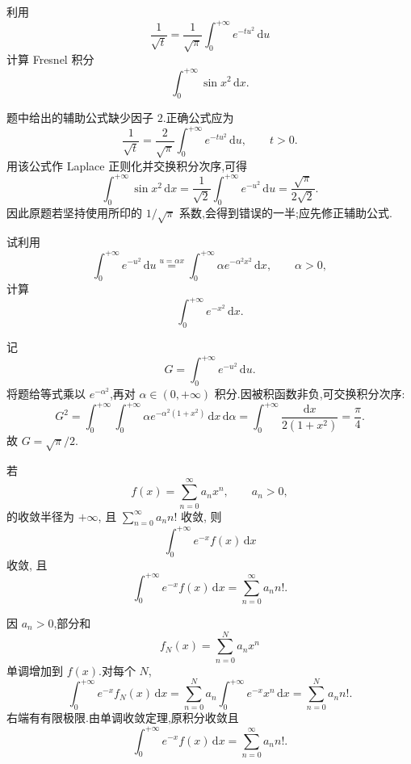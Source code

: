 \begin{example}
    利用
    \[
        \dfrac{1}{\sqrt{t}}=\dfrac{1}{\sqrt{\pi}}\int_0^{+\infty}e^{-tu^2}\,\mathrm{d}u
    \]
    计算 Fresnel 积分
    \[
        \int_0^{+\infty}\sin x^2\,\mathrm{d}x.
    \]
\end{example}
\exampleblank

\begin{solution}
    题中给出的辅助公式缺少因子 $2$.正确公式应为
    \[
        \dfrac{1}{\sqrt t}=\dfrac{2}{\sqrt\pi}\int_0^{+\infty}e^{-tu^2}\,\mathrm{d}u,
        \qquad t>0.
    \]
    用该公式作 Laplace 正则化并交换积分次序,可得
    \[
        \int_0^{+\infty}\sin x^2\,\mathrm{d}x
        =\dfrac{1}{\sqrt2}\int_0^{+\infty}e^{-u^2}\,\mathrm{d}u
        =\dfrac{\sqrt\pi}{2\sqrt2}.
    \]
    因此原题若坚持使用所印的 $1/\sqrt\pi$ 系数,会得到错误的一半;应先修正辅助公式.
\end{solution}

\begin{example}
    试利用
    \[
        \int_0^{+\infty}e^{-u^2}\,\mathrm{d}u
        \overset{u=\alpha x}{=}
        \int_0^{+\infty}\alpha e^{-\alpha^2x^2}\,\mathrm{d}x,
        \qquad \alpha>0,
    \]
    计算
    \[
        \int_0^{+\infty}e^{-x^2}\,\mathrm{d}x.
    \]
\end{example}
\exampleblank

\begin{solution}
    记
    \[
        G=\int_0^{+\infty}e^{-u^2}\,\mathrm{d}u.
    \]
    将题给等式乘以 $e^{-\alpha^2}$,再对 $\alpha\in(0,+\infty)$ 积分.因被积函数非负,可交换积分次序:
    \[
        G^2=\int_0^{+\infty}\int_0^{+\infty}
        \alpha e^{-\alpha^2(1+x^2)}\,\mathrm{d}x\,\mathrm{d}\alpha
        =\int_0^{+\infty}\dfrac{\mathrm{d}x}{2(1+x^2)}
        =\dfrac{\pi}{4}.
    \]
    故 $G=\sqrt\pi/2$.
\end{solution}

\begin{example}
    若
    \[
        f(x)=\sum\limits_{n=0}^{\infty}a_nx^n,\qquad a_n>0,
    \]
    的收敛半径为 $+\infty$, 且 $\displaystyle\sum\limits_{n=0}^{\infty}a_nn!$ 收敛, 则
    \[
        \int_0^{+\infty}e^{-x}f(x)\,\mathrm{d}x
    \]
    收敛, 且
    \[
        \int_0^{+\infty}e^{-x}f(x)\,\mathrm{d}x
        =\sum\limits_{n=0}^{\infty}a_nn!.
    \]
\end{example}
\exampleblank

\begin{solution}
    因 $a_n>0$,部分和
    \[
        f_N(x)=\sum\limits_{n=0}^N a_nx^n
    \]
    单调增加到 $f(x)$.对每个 $N$,
    \[
        \int_0^{+\infty}e^{-x}f_N(x)\,\mathrm{d}x
        =\sum\limits_{n=0}^Na_n\int_0^{+\infty}e^{-x}x^n\,\mathrm{d}x
        =\sum\limits_{n=0}^Na_nn!.
    \]
    右端有有限极限.由单调收敛定理,原积分收敛且
    \[
        \int_0^{+\infty}e^{-x}f(x)\,\mathrm{d}x
        =\sum\limits_{n=0}^{\infty}a_nn!.
    \]
\end{solution}

